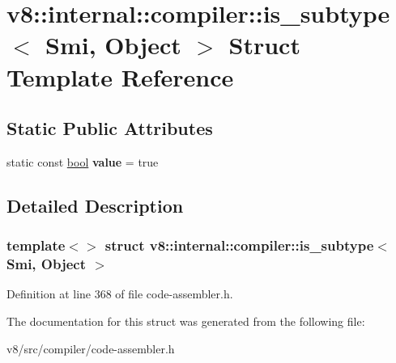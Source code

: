 \hypertarget{structv8_1_1internal_1_1compiler_1_1is__subtype_3_01Smi_00_01Object_01_4}{}\section{v8\+:\+:internal\+:\+:compiler\+:\+:is\+\_\+subtype$<$ Smi, Object $>$ Struct Template Reference}
\label{structv8_1_1internal_1_1compiler_1_1is__subtype_3_01Smi_00_01Object_01_4}
\subsection*{Static Public Attributes}
\begin{DoxyCompactItemize}
\item 
\mbox{\label{structv8_1_1internal_1_1compiler_1_1is__subtype_3_01Smi_00_01Object_01_4_ac8a55367832079a7b1ccc2a6b1e25645}} 
static const \mbox{\hyperlink{classbool}{bool}} {\bfseries value} = true
\end{DoxyCompactItemize}


\subsection{Detailed Description}
\subsubsection*{template$<$$>$\newline
struct v8\+::internal\+::compiler\+::is\+\_\+subtype$<$ Smi, Object $>$}



Definition at line 368 of file code-\/assembler.\+h.



The documentation for this struct was generated from the following file\+:\begin{DoxyCompactItemize}
\item 
v8/src/compiler/code-\/assembler.\+h\end{DoxyCompactItemize}
